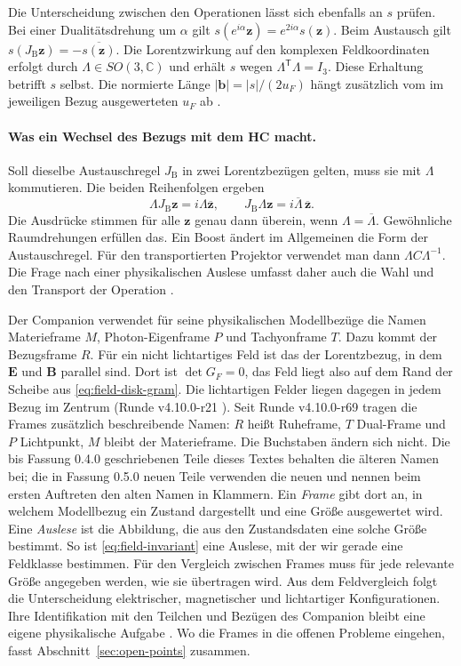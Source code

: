 Die Unterscheidung zwischen den Operationen lässt sich ebenfalls an \(s\) prüfen. Bei einer Dualitätsdrehung um \(\alpha\) gilt \(s(e^{i\alpha}\mathbf z)=e^{2i\alpha}s(\mathbf z)\). Beim Austausch gilt \(s(J_{\mathrm B}\mathbf z)=-\overline{s(\mathbf z)}\). Die Lorentzwirkung auf den komplexen Feldkoordinaten erfolgt durch \(\Lambda\in SO(3,\mathbb C)\) und erhält \(s\) wegen \(\Lambda^{\mathsf T}\Lambda=I_3\). Diese Erhaltung betrifft \(s\) selbst. Die normierte Länge \(|\mathbf b|=|s|/(2u_F)\) hängt zusätzlich vom im jeweiligen Bezug ausgewerteten \(u_F\) ab \cite{feldkern,feldsektoren}.

\paragraph{Was ein Wechsel des Bezugs mit dem HC macht.}
Soll dieselbe Austauschregel \(J_{\mathrm B}\) in zwei Lorentzbezügen gelten, muss sie mit \(\Lambda\) kommutieren. Die beiden Reihenfolgen ergeben
\[
 \Lambda J_{\mathrm B}\mathbf z=i\Lambda\overline{\mathbf z},\qquad
 J_{\mathrm B}\Lambda\mathbf z=i\overline\Lambda\,\overline{\mathbf z}.
\]
Die Ausdrücke stimmen für alle \(\mathbf z\) genau dann überein, wenn \(\Lambda=\overline\Lambda\). Gewöhnliche Raumdrehungen erfüllen das. Ein Boost ändert im Allgemeinen die Form der Austauschregel. Für den transportierten Projektor verwendet man dann \(\Lambda C\Lambda^{-1}\). Die Frage nach einer physikalischen Auslese umfasst daher auch die Wahl und den Transport der Operation \cite{feldsektoren,grundidee}.

Der Companion verwendet für seine physikalischen Modellbezüge die Namen Materieframe \(M\), Photon-Eigenframe \(P\) und Tachyonframe \(T\). Dazu kommt der Bezugsframe \(R\). Für ein nicht lichtartiges Feld ist das der Lorentzbezug, in dem \(\mathbf E\) und \(\mathbf B\) parallel sind. Dort ist \(\det G_F=0\), das Feld liegt also auf dem Rand der Scheibe aus \eqref{eq:field-disk-gram}. Die lichtartigen Felder liegen dagegen in jedem Bezug im Zentrum (Runde v4.10.0-r21 \cite{companion}). Seit Runde v4.10.0-r69 tragen die Frames zusätzlich beschreibende Namen: \(R\) heißt Ruheframe, \(T\) Dual-Frame und \(P\) Lichtpunkt, \(M\) bleibt der Materieframe. Die Buchstaben ändern sich nicht. Die bis Fassung 0.4.0 geschriebenen Teile dieses Textes behalten die älteren Namen bei; die in Fassung 0.5.0 neuen Teile verwenden die neuen und nennen beim ersten Auftreten den alten Namen in Klammern. Ein \emph{Frame} gibt dort an, in welchem Modellbezug ein Zustand dargestellt und eine Größe ausgewertet wird. Eine \emph{Auslese} ist die Abbildung, die aus den Zustandsdaten eine solche Größe bestimmt. So ist \eqref{eq:field-invariant} eine Auslese, mit der wir gerade eine Feldklasse bestimmen. Für den Vergleich zwischen Frames muss für jede relevante Größe angegeben werden, wie sie übertragen wird. Aus dem Feldvergleich folgt die Unterscheidung elektrischer, magnetischer und lichtartiger Konfigurationen. Ihre Identifikation mit den Teilchen und Bezügen des Companion bleibt eine eigene physikalische Aufgabe \cite{companion,grundidee}. Wo die Frames in die offenen Probleme eingehen, fasst Abschnitt~\ref{sec:open-points} zusammen.

